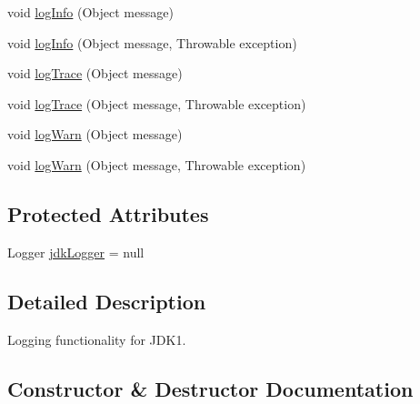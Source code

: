 \begin{DoxyCompactItemize}
\item 
void \mbox{\hyperlink{classcom_1_1mysql_1_1jdbc_1_1log_1_1_jdk14_logger_ad10df21ceab0fe74659381483cc45ebb}{log\+Info}} (Object message)
\item 
void \mbox{\hyperlink{classcom_1_1mysql_1_1jdbc_1_1log_1_1_jdk14_logger_ac14f891efdd7a92c4b6165555221f008}{log\+Info}} (Object message, Throwable exception)
\item 
void \mbox{\hyperlink{classcom_1_1mysql_1_1jdbc_1_1log_1_1_jdk14_logger_aca41ec6e1a9048dff00daed4ad32050b}{log\+Trace}} (Object message)
\item 
void \mbox{\hyperlink{classcom_1_1mysql_1_1jdbc_1_1log_1_1_jdk14_logger_a9dd684e245ffdef5262bdd185171f773}{log\+Trace}} (Object message, Throwable exception)
\item 
void \mbox{\hyperlink{classcom_1_1mysql_1_1jdbc_1_1log_1_1_jdk14_logger_aabfcbedefd9337d8f67f28a2c4a2a3ff}{log\+Warn}} (Object message)
\item 
void \mbox{\hyperlink{classcom_1_1mysql_1_1jdbc_1_1log_1_1_jdk14_logger_a7fb95a94f7be44f70e933e99e822bf02}{log\+Warn}} (Object message, Throwable exception)
\end{DoxyCompactItemize}
\subsection*{Protected Attributes}
\begin{DoxyCompactItemize}
\item 
Logger \mbox{\hyperlink{classcom_1_1mysql_1_1jdbc_1_1log_1_1_jdk14_logger_adc3897dd5e671b9f64375ebf1478998a}{jdk\+Logger}} = null
\end{DoxyCompactItemize}


\subsection{Detailed Description}
Logging functionality for J\+D\+K1. 

\subsection{Constructor \& Destructor Documentation}
\mbox{\label{classcom_1_1mysql_1_1jdbc_1_1log_1_1_jdk14_logger_ad663d870bdbd73c02ea65bbe920d5131}} 
